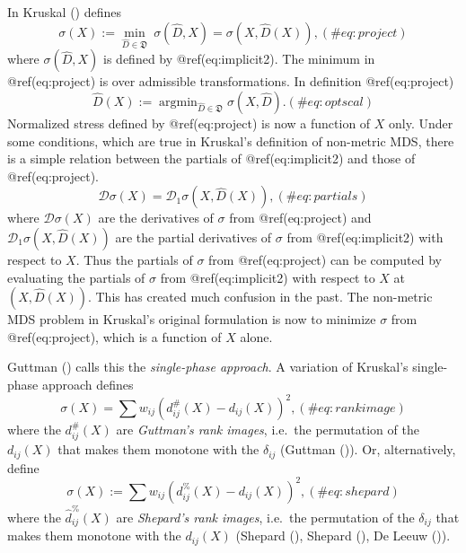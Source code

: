 \documentclass[
  12pt,
  letterpaper,
  DIV=11,
  numbers=noendperiod]{scrartcl}
\theoremstyle{plain}
\theoremstyle{remark}
\begin{document}
In Kruskal () defines \begin{equation}
\sigma(X):=\min_{\hat D\in\mathfrak{D}}\ \sigma(\hat D,X)=\sigma(X,\hat D(X)),
(\#eq:project)
\end{equation} where \(\sigma(\hat D,X)\) is defined by
@ref(eq:implicit2). The minimum in @ref(eq:project) is over admissible
transformations. In definition @ref(eq:project) \begin{equation}
\hat D(X):=\mathop{\text{argmin}}_{\hat D\in\mathfrak{D}}\sigma(X, \hat D).
(\#eq:optscal)
\end{equation} Normalized stress defined by @ref(eq:project) is now a
function of \(X\) only. Under some conditions, which are true in
Kruskal's definition of non-metric MDS, there is a simple relation
between the partials of @ref(eq:implicit2) and those of
@ref(eq:project). \begin{equation}
\mathcal{D}\sigma(X)=\mathcal{D}_1\sigma(X,\hat D(X)),
(\#eq:partials)
\end{equation} where \(\mathcal{D}\sigma(X)\) are the derivatives of
\(\sigma\) from @ref(eq:project) and
\(\mathcal{D}_1\sigma(X,\hat D(X))\) are the partial derivatives of
\(\sigma\) from @ref(eq:implicit2) with respect to \(X\). Thus the
partials of \(\sigma\) from @ref(eq:project) can be computed by
evaluating the partials of \(\sigma\) from @ref(eq:implicit2) with
respect to \(X\) at \((X,\hat D(X))\). This has created much confusion
in the past. The non-metric MDS problem in Kruskal's original
formulation is now to minimize \(\sigma\) from @ref(eq:project), which
is a function of \(X\) alone.

Guttman () calls this the
\emph{single-phase approach}. A variation of Kruskal's single-phase
approach defines \begin{equation}
\sigma(X)=\sum w_{ij}(d_{ij}^\#(X)-d_{ij}(X))^2,
(\#eq:rankimage)
\end{equation} where the \(d_{ij}^\#(X)\) are \emph{Guttman's rank
images}, i.e.~the permutation of the \(d_{ij}(X)\) that makes them
monotone with the \(\delta_{ij}\) (Guttman
()). Or, alternatively, define
\begin{equation}
\sigma(X):=\sum   w_{ij}(d_{ij}^\%(X)-d_{ij}(X))^2,
(\#eq:shepard)
\end{equation} where the \(\hat d_{ij}^\%(X)\) are \emph{Shepard's rank
images}, i.e.~the permutation of the \(\delta_{ij}\) that makes them
monotone with the \(d_{ij}(X)\) (Shepard
(), Shepard
(), De Leeuw
()).
\end{document}
